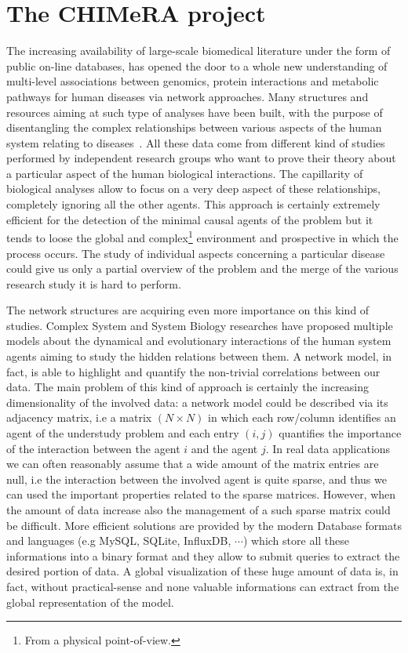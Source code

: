 \documentclass{standalone}
\begin{document}
\section[CHIMeRA]{The CHIMeRA project}\label{chimera:chimera}

The increasing availability of large-scale biomedical literature under the form of public on-line databases, has opened the door to a whole new understanding of multi-level associations between genomics, protein interactions and metabolic pathways for human diseases via network approaches.
Many structures and resources aiming at such type of analyses have been built, with the purpose of disentangling the complex relationships between various aspects of the human system relating to diseases~\cite{SymtomsNet, HumanPhenotype}.
All these data come from different kind of studies performed by independent research groups who want to prove their theory about a particular aspect of the human biological interactions.
The capillarity of biological analyses allow to focus on a very deep aspect of these relationships, completely ignoring all the other agents.
This approach is certainly extremely efficient for the detection of the minimal causal agents of the problem but it tends to loose the global and complex\footnote{
  From a physical point-of-view.
} environment and prospective in which the process occurs.
The study of individual aspects concerning a particular disease could give us only a partial overview of the problem and the merge of the various research study it is hard to perform.

The network structures are acquiring even more importance on this kind of studies.
Complex System and System Biology researches have proposed multiple models about the dynamical and evolutionary interactions of the human system agents aiming to study the hidden relations between them.
A network model, in fact, is able to highlight and quantify the non-trivial correlations between our data.
The main problem of this kind of approach is certainly the increasing dimensionality of the involved data: a network model could be described via its adjacency matrix, i.e a matrix $(N\times N)$ in which each row/column identifies an agent of the understudy problem and each entry $(i, j)$ quantifies the importance of the interaction between the agent $i$ and the agent $j$.
In real data applications we can often reasonably assume that a wide amount of the matrix entries are null, i.e the interaction between the involved agent is quite sparse, and thus we can used the important properties related to the sparse matrices.
However, when the amount of data increase also the management of a such sparse matrix could be difficult.
More efficient solutions are provided by the modern Database formats and languages (e.g MySQL, SQLite, InfluxDB, $\cdots$) which store all these informations into a binary format and they allow to submit queries to extract the desired portion of data.
A global visualization of these huge amount of data is, in fact, without practical-sense and none valuable informations can extract from the global representation of the model.
\end{document}
